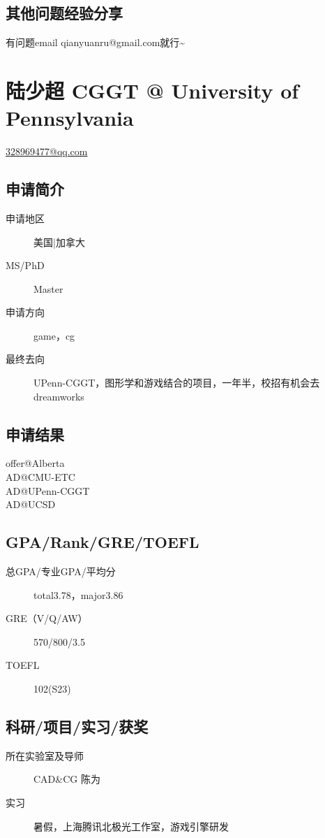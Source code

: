 \documentclass[11pt,fleqn,openany]{book} %
\begin{document}
\subsection*{其他问题经验分享}
有问题email qianyuanru@gmail.com就行\textasciitilde{}
\clearpage
\section{陆少超 CGGT @ University of Pennsylvania}
\hfill \href{mailto:328969477@qq.com}{328969477@qq.com}

\noindent\begin{minipage}[t]{0.45\textwidth}
\subsection*{申请简介}
\begin{description}
\item[申请地区] 美国|加拿大
\item[MS/PhD] Master
\item[申请方向] game，cg
\item[最终去向] UPenn-CGGT，图形学和游戏结合的项目，一年半，校招有机会去dreamworks
\end{description}
\end{minipage}
\hfill
\begin{minipage}[t]{0.45\textwidth}
\subsection*{申请结果}
\noindent offer@Alberta\\
AD@CMU-ETC\\
AD@UPenn-CGGT\\
AD@UCSD
\end{minipage}
\subsection*{GPA/Rank/GRE/TOEFL}
\begin{description}
\item[总GPA/专业GPA/平均分] total3.78，major3.86
\item[GRE（V/Q/AW）] 570/800/3.5
\item[TOEFL] 102(S23)
\end{description}

\subsection*{科研/项目/实习/获奖}
\begin{description}
\item[所在实验室及导师] CAD\&CG 陈为
\item[实习] 暑假，上海腾讯北极光工作室，游戏引擎研发
\end{description}
\end{document}
